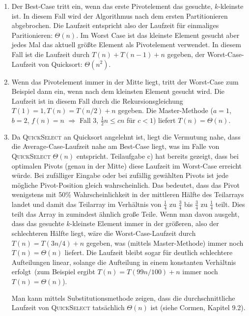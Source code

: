 \documentclass[11pt,a4paper]{article}
\begin{document}
\begin{loesung}
\begin{enumerate}
        \item
        Der Best-Case tritt ein, wenn das erste Pivotelement das gesuchte, $k$-kleinste ist.
        In diesem Fall wird der Algorithmus nach dem ersten Partitionieren abgebrochen.
        Die Laufzeit entspricht also der Laufzeit für einmaliges Paritionieren: $\Theta(n)$.
        Im Worst Case ist das kleinste Element gesucht aber jedes Mal das aktuell größte Element als Pivotelement verwendet.
        In diesem Fall ist die Laufzeit durch $T(n) + T(n - 1) + n$ gegeben, der Worst-Case-Laufzeit von Quicksort: $\Theta(n^2)$.

        \item
        Wenn das Pivotelement immer in der Mitte liegt, tritt der Worst-Case zum Beispiel dann ein, wenn nach dem kleinsten Element gesucht wird.
        Die Laufzeit ist in diesem Fall durch die Rekursionsgleichung $T(1) = 1, T(n) = T(n / 2) + n$ gegeben. Die Master-Methode ($a = 1$, $b = 2$, $f(n) = n$ $\Rightarrow$ Fall 3, $\frac{1}{2} n \leq cn$ für $c < 1$) liefert $T(n) = \Theta(n)$.

        \item Da \textsc{QuickSelect} an Quicksort angelehnt ist, liegt die Vermutung nahe, dass die Average-Case-Laufzeit nahe am Best-Case liegt, was im Falle von \textsc{QuickSelect} $\Theta(n)$ entspricht.
        Teilaufgabe c) hat bereits gezeigt, dass bei optimalen Pivots (genau in der Mitte) diese Laufzeit im Worst-Case erreicht würde.
        Bei zufälliger Eingabe oder bei zufällig gewählten Pivots ist jede mögliche Pivot-Position gleich wahrscheinlich.
        Das bedeutet, dass das Pivot wenigstens mit 50\% Wahrscheinlichkeit in der mittleren Hälfte des Teilarrays landet und damit das Teilarray im Verhältnis von $\frac{1}{4}$ zu $\frac{3}{4}$ bis $\frac{3}{4}$ zu $\frac{1}{4}$ teilt. 
        Dies teilt das Array in zumindest ähnlich große Teile.
        Wenn man davon ausgeht, dass das gesuchte $k$-kleinste Element immer in der größeren, also der \glqq{}schlechteren\grqq{} Hälfte liegt, wäre die Worst-Case-Laufzeit durch $T(n) = T(3n / 4) + n$ gegeben, was (mittels Master-Methode) immer noch $T(n) = \Theta(n)$ liefert.
        Die Laufzeit bleibt sogar für deutlich schlechtere Aufteilungen linear, solange die Aufteilung in einem konstanten Verhältnis erfolgt~(zum Beispiel ergibt $T(n) = T(99n / 100) + n$ immer noch $T(n) = \Theta(n)$).

        Man kann mittels Substitutionsmethode zeigen, dass die durchschnittliche Laufzeit von \textsc{QuickSelect} tatsächlich $\Theta(n)$ ist (siehe Cormen, Kapitel 9.2).
    \end{enumerate}
\end{loesung}
\end{document}
